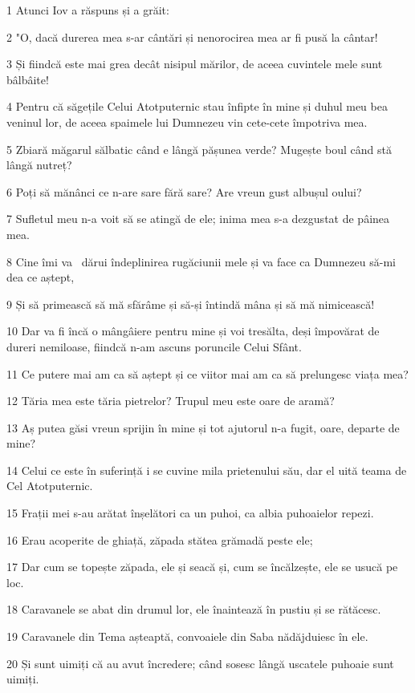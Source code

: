 \par 1 Atunci Iov a răspuns și a grăit:
\par 2 "O, dacă durerea mea s-ar cântări și nenorocirea mea ar fi pusă la cântar!
\par 3 Și fiindcă este mai grea decât nisipul mărilor, de aceea cuvintele mele sunt bâlbâite!
\par 4 Pentru că săgețile Celui Atotputernic stau înfipte în mine și duhul meu bea veninul lor, de aceea spaimele lui Dumnezeu vin cete-cete împotriva mea.
\par 5 Zbiară măgarul sălbatic când e lângă pășunea verde? Mugește boul când stă lângă nutreț?
\par 6 Poți să mănânci ce n-are sare fără sare? Are vreun gust albușul oului?
\par 7 Sufletul meu n-a voit să se atingă de ele; inima mea s-a dezgustat de pâinea mea.
\par 8 Cine îmi va  dărui îndeplinirea rugăciunii mele și va face ca Dumnezeu să-mi dea ce aștept,
\par 9 Și să primească să mă sfărâme și să-și întindă mâna și să mă nimicească!
\par 10 Dar va fi încă o mângâiere pentru mine și voi tresălta, deși împovărat de dureri nemiloase, fiindcă n-am ascuns poruncile Celui Sfânt.
\par 11 Ce putere mai am ca să aștept și ce viitor mai am ca să prelungesc viața mea?
\par 12 Tăria mea este tăria pietrelor? Trupul meu este oare de aramă?
\par 13 Aș putea găsi vreun sprijin în mine și tot ajutorul n-a fugit, oare, departe de mine?
\par 14 Celui ce este în suferință i se cuvine mila prietenului său, dar el uită teama de Cel Atotputernic.
\par 15 Frații mei s-au arătat înșelători ca un puhoi, ca albia puhoaielor repezi.
\par 16 Erau acoperite de ghiață, zăpada stătea grămadă peste ele;
\par 17 Dar cum se topește zăpada, ele și seacă și, cum se încălzește, ele se usucă pe loc.
\par 18 Caravanele se abat din drumul lor, ele înaintează în pustiu și se rătăcesc.
\par 19 Caravanele din Tema așteaptă, convoaiele din Saba nădăjduiesc în ele.
\par 20 Și sunt uimiți că au avut încredere; când sosesc lângă uscatele puhoaie sunt uimiți.
